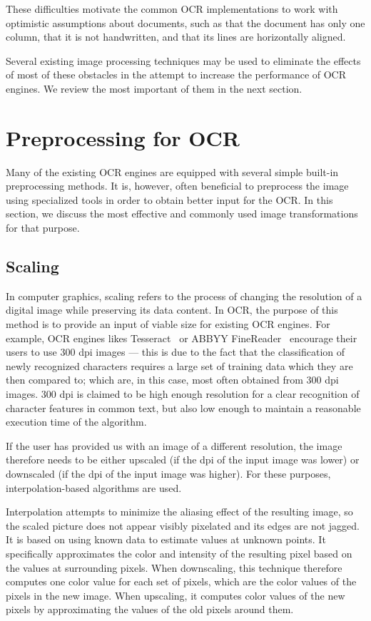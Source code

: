 These difficulties motivate the common OCR implementations to work with optimistic assumptions about documents, such as that the document has only one column, that it is not handwritten, and that its lines are horizontally aligned.

Several existing image processing techniques may be used to eliminate the effects of most of these obstacles in the attempt to increase the performance of OCR engines. We review the most important of them in the next section.

\section{Preprocessing for OCR}

Many of the existing OCR engines are equipped with several simple built-in preprocessing methods. It is, however, often beneficial to preprocess the image using specialized tools in order to obtain better input for the OCR. In this section, we discuss the most effective and commonly used image transformations for that purpose.

\subsection{Scaling} \label{scaling}

In computer graphics, scaling refers to the process of changing the resolution of a digital image while preserving its data content. In OCR, the purpose of this method is to provide an input of viable size for existing OCR engines. For example, OCR engines likes Tesseract~\cite{TesseractQual} or ABBYY FineReader~\cite{ABBYYdpi} encourage their users to use 300 dpi images --- this is due to the fact that the classification of newly recognized characters requires a large set of training data which they are then compared to; which are, in this case, most often obtained from 300 dpi images. 300 dpi is claimed to be high enough resolution for a clear recognition of character features in common text, but also low enough to maintain a reasonable execution time of the algorithm.

If the user has provided us with an image of a different resolution, the image therefore needs to be either upscaled (if the dpi of the input image was lower) or downscaled (if the dpi of the input image was higher). For these purposes, interpolation-based algorithms are used.

Interpolation attempts to minimize the aliasing effect of the resulting image, so the scaled picture does not appear visibly pixelated and its edges are not jagged. It is based on using known data to estimate values at unknown points. It specifically approximates the color and intensity of the resulting pixel based on the values at surrounding pixels. When downscaling, this technique therefore computes one color value for each set of pixels, which are the color values of the pixels in the new image. When upscaling, it computes color values of the new pixels by approximating the values of the old pixels around them.

